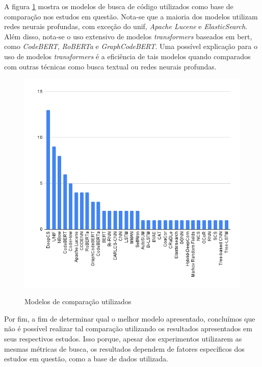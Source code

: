 A figura \ref{fig:related-baselines} mostra os modelos de busca de código utilizados como base de comparação nos estudos em questão. Nota-se que a maioria dos modelos utilizam redes neurais profundas, com exceção do \gls{unif}, \textit{Apache Lucene} e \textit{ElasticSearch}. Além disso, nota-se o uso extensivo de modelos \textit{transformers} baseados em \gls{bert}, como \textit{CodeBERT}, \textit{RoBERTa} e \textit{GraphCodeBERT}. Uma possível explicação para o uso de modelos \textit{transformers} é a eficiência de tais modelos quando comparados com outras técnicas como busca textual ou redes neurais profundas.
\begin{figure}[htbp]
    \centering
        \caption{Modelos de comparação utilizados}
        \includegraphics[scale=0.5]{./resources/images/relacionados/baselines.png}
        \label{fig:related-baselines}
\end{figure}

Por fim, a fim de determinar qual o melhor modelo apresentado, concluímos que não é possível realizar tal comparação utilizando os resultados apresentados em seus respectivos estudos. Isso porque, apesar dos experimentos utilizarem as mesmas métricas de busca, os resultados dependem de fatores específicos dos estudos em questão, como a base de dados utilizada.
